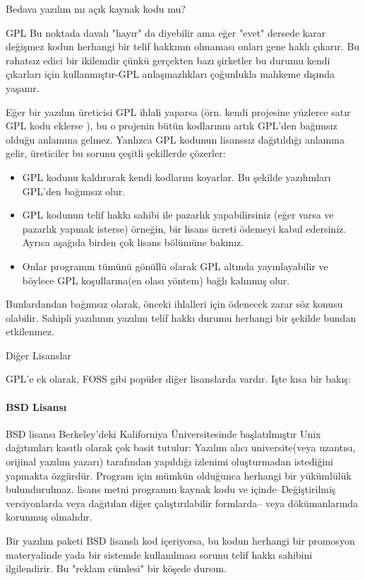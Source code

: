 \documentclass[10pt,a5paper]{book}
\begin{document}
\begin{section}{Bedava yazılım mı açık kaynak kodu mu?}
\begin{subsection}{GPL}
Bu noktada davalı "hayır" da diyebilir ama eğer "evet" dersede karar değişmez kodun herhangi bir telif hakkının olmaması onları gene haklı çıkarır. Bu rahatsız edici bir ikilemdir çünkü gerçekten bazı şirketler bu durumu kendi çıkarları için kullanmıştır-GPL anlaşmazlıkları çoğunlukla mahkeme dışında yaşanır.

Eğer bir yazılım üreticisi GPL ihlali yaparsa (örn. kendi projesine yüzlerce satır GPL kodu eklerse ), bu o projenin bütün kodlarının artık GPL'den bağımsız olduğu anlamına gelmez. Yanlızca GPL kodunun lisanssız dağıtıldığı anlamına gelir, üreticiler  bu sorunu çeşitli şekillerde çözerler:
\begin{itemize}
 \item GPL kodunu kaldırarak kendi kodlarını koyarlar. Bu şekilde yazılımları GPL'den bağımsız olur.
 \item GPL kodunun  telif hakkı sahibi ile pazarlık yapabilirsiniz (eğer varsa ve pazarlık yapmak isterse) örneğin, bir lisans ücreti ödemeyi kabul edersiniz.
Ayrıca aşağıda birden çok lisans bölümüne bakınız.
 \item Onlar programın tümünü gönüllü olarak GPL altında  yayınlayabilir ve böylece GPL koşullarına(en olası yöntem) bağlı kalınmış olur.
 \end{itemize}

Bunlardandan bağımsız olarak, önceki ihlalleri için ödenecek zarar söz konusu olabilir. Sahipli yazılımın yazılım telif hakkı durumu  herhangi bir şekilde bundan etkilenmez.
\end{subsection}
\begin{subsection}{Diğer Lisanslar}

GPL'e ek olarak, FOSS gibi popüler diğer lisanslarda vardır. Işte kısa bir bakış:

\paragraph{BSD Lisansı}{BSD lisansı Berkeley'deki Kaliforniya Üniversitesinde başlatılmıştır Unix dağıtımları kasıtlı olarak çok basit tutulur: Yazılım alıcı universite(veya uzantısı, orijinal yazılım yazarı)  tarafından yapıldığı izlenimi oluşturmadan istediğini yapmakta özgürdür. Program için mümkün olduğunca herhangi bir yükümlülük bulundurulmaz. lisans metni programın kaynak kodu ve içinde--Değiştirilmiş versiyonlarda veya dağıtılan diğer çalıştırılabilir formlarda-- veya dökümanlarında korunmuş olmalıdır.}

Bir yazılım paketi BSD lisanslı kod içeriyorsa, bu kodun herhangi bir promosyon materyalinde yada bir sistemde kullanılması sorunu  telif hakkı sahibini ilgilendirir. Bu "reklam cümlesi" bir köşede dursun.


\end{subsection}
\end{section}
\end{document}
